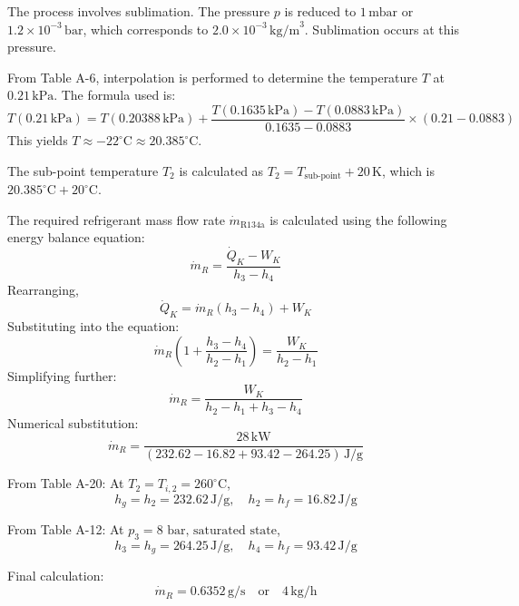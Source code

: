 The process involves sublimation. The pressure \( p \) is reduced to \( 1 \, \text{mbar} \) or \( 1.2 \times 10^{-3} \, \text{bar} \), which corresponds to \( 2.0 \times 10^{-3} \, \text{kg/m}^3 \). Sublimation occurs at this pressure.  

From Table A-6, interpolation is performed to determine the temperature \( T \) at \( 0.21 \, \text{kPa} \). The formula used is:  
\[
T(0.21 \, \text{kPa}) = T(0.20388 \, \text{kPa}) + \frac{T(0.1635 \, \text{kPa}) - T(0.0883 \, \text{kPa})}{0.1635 - 0.0883} \times (0.21 - 0.0883)
\]  
This yields \( T \approx -22^\circ\text{C} \approx 20.385^\circ\text{C} \).  

The sub-point temperature \( T_2 \) is calculated as \( T_2 = T_{\text{sub-point}} + 20 \, \text{K} \), which is \( 20.385^\circ\text{C} + 20^\circ\text{C} \).

The required refrigerant mass flow rate \( \dot{m}_{\text{R134a}} \) is calculated using the following energy balance equation:  
\[
\dot{m}_R = \frac{\dot{Q}_K - W_K}{h_3 - h_4}
\]  
Rearranging,  
\[
\dot{Q}_K = \dot{m}_R (h_3 - h_4) + W_K
\]  
Substituting into the equation:  
\[
\dot{m}_R \left( 1 + \frac{h_3 - h_4}{h_2 - h_1} \right) = \frac{W_K}{h_2 - h_1}
\]  
Simplifying further:  
\[
\dot{m}_R = \frac{W_K}{h_2 - h_1 + h_3 - h_4}
\]  
Numerical substitution:  
\[
\dot{m}_R = \frac{28 \, \text{kW}}{(232.62 - 16.82 + 93.42 - 264.25) \, \text{J/g}}
\]  

From Table A-20:  
At \( T_2 = T_{i,2} = 260^\circ\text{C} \),  
\[
h_g = h_2 = 232.62 \, \text{J/g}, \quad h_2 = h_f = 16.82 \, \text{J/g}
\]  

From Table A-12:  
At \( p_3 = \text{8 bar, saturated state} \),  
\[
h_3 = h_g = 264.25 \, \text{J/g}, \quad h_4 = h_f = 93.42 \, \text{J/g}
\]  

Final calculation:  
\[
\dot{m}_R = 0.6352 \, \text{g/s} \quad \text{or} \quad 4 \, \text{kg/h}
\]